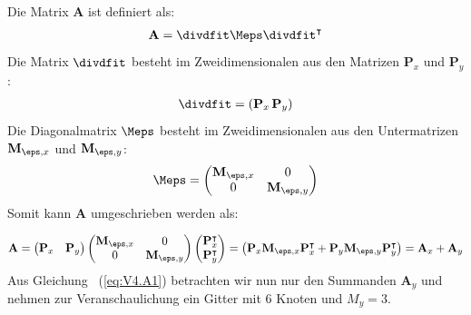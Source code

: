 \documentclass[./Protokollheft.tex]{subfiles}
\begin{document}
Die Matrix $\mathbf{A}$ ist definiert als:
\begin{align}
	\mathbf{A}=\divdfit\Meps\divdfit^\intercal
\end{align}
Die Matrix $\divdfit$ besteht im Zweidimensionalen aus den Matrizen $\mathbf{P}_x$ und $\mathbf{P}_y$ :
\begin{align}
	\divdfit=\left(\mathbf{P}_x \, \mathbf{P}_y \right)
\end{align}
Die Diagonalmatrix $\Meps$ besteht im Zweidimensionalen aus den Untermatrizen $\mathbf{M}_{\eps,x}$ und $\mathbf{M}_{\eps,y}$:
\begin{align}
\Meps = \begin{pmatrix} 
    \mathbf{M}_{\eps,x}	& 0 	 				\\
	0  	 				& \mathbf{M}_{\eps,y}	\\
    \end{pmatrix}
\end{align}
Somit kann $\mathbf{A}$ umgeschrieben werden als:

\begin{align}
\mathbf{A} =  
\begin{pmatrix} 
    \mathbf{P}_x	&	\mathbf{P}_y	\\
\end{pmatrix} 
\begin{pmatrix}
\mathbf{M}_{\eps,x}	& 0 	 				\\
0  	 				& \mathbf{M}_{\eps,y}	\\
\end{pmatrix}
\begin{pmatrix} 
    \mathbf{P}_x^\intercal	\\
	\mathbf{P}_y^\intercal	\\
\end{pmatrix} 
=
\left(\mathbf{P}_x\mathbf{M}_{\eps,x}\mathbf{P}_x^\intercal + \mathbf{P}_y \mathbf{M}_{\eps,y} \mathbf{P}_y^\intercal \right)
=\mathbf{A}_x+\mathbf{A}_y
\label{eq:V4.A1}
\end{align}
Aus Gleichung ~(\ref{eq:V4.A1}) betrachten wir nun nur den Summanden $\mathbf{A}_y$ und nehmen zur Veranschaulichung ein Gitter mit 6 Knoten und $M_y=3$.
\end{document}
